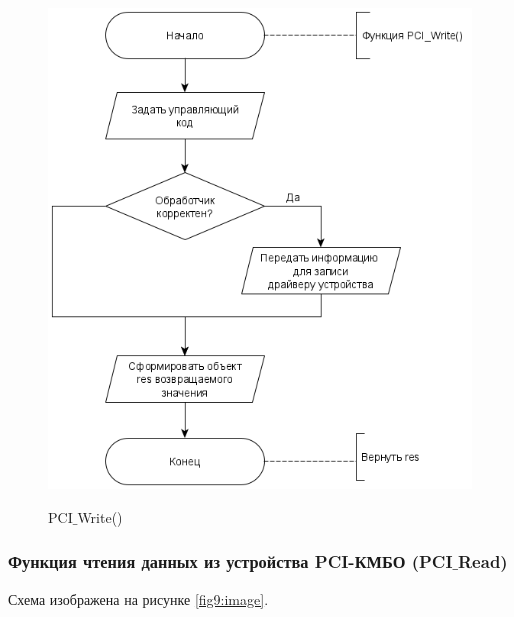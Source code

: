 	\begin{figure}[ph!]
		\centering
		\begin{center}
			{\includegraphics[scale=0.5]{schemes/pci_write.png}}
			\caption{PCI$\_$Write()}
			\label{fig8:image}
		\end{center}
	\end{figure}

	\newpage
	
	\subsubsection{Функция чтения данных из устройства PCI-КМБО (PCI$\_$Read)}
	
	Схема изображена на рисунке \ref{fig9:image}.
	
